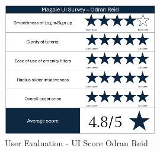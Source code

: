 \begin{figure}[htbp]
    \centering
    \includegraphics[width=0.6\textwidth]{images/survey-odran.png}
    \caption{User Evaluation - UI Score Odran Reid}
    \label{fig:odranscore}
\end{figure}

\newpage{}